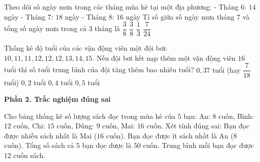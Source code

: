\begin{ex} %
Theo dõi số ngày mưa trong các tháng mùa hè tại một địa phương:
- Tháng 6: $14$ ngày
- Tháng 7: $18$ ngày
- Tháng 8: $16$ ngày
Tỉ số giữa số ngày mưa tháng 7 và tổng số ngày mưa trong cả 3 tháng là
\choice
{$\dfrac{3}{8}$}
{\True $\dfrac{3}{8}$}
{$\dfrac{1}{3}$}
{$\dfrac{7}{24}$}
\end{ex}

\begin{ex} %
Thống kê độ tuổi của các vận động viên một đội bơi: $10, 11, 11, 12, 12, 12, 13, 14, 15$. Nếu đội bơi kết nạp thêm một vận động viên $16$ tuổi thì số tuổi trung bình của đội tăng thêm bao nhiêu tuổi?
\choice
{\True $0{,}37$ tuổi (hay $\dfrac{7}{18}$ tuổi)}
{$0{,}2$ tuổi}
{$0{,}4$ tuổi}
{$0{,}5$ tuổi}
\end{ex}

\textbf{Phần 2. Trắc nghiệm đúng sai}

\begin{ex} %
Cho bảng thống kê số lượng sách đọc trong mùa hè của $5$ bạn: An: $8$ cuốn, Bình: $12$ cuốn, Chi: $15$ cuốn, Dũng: $9$ cuốn, Mai: $16$ cuốn. Xét tính đúng sai:
\choiceTF
{\True Bạn đọc được nhiều sách nhất là Mai ($16$ cuốn).}
{\True Bạn đọc được ít sách nhất là An ($8$ cuốn).}
{Tổng số sách cả 5 bạn đọc được là $50$ cuốn.}
{\True Trung bình mỗi bạn đọc được $12$ cuốn sách.}
\end{ex}

